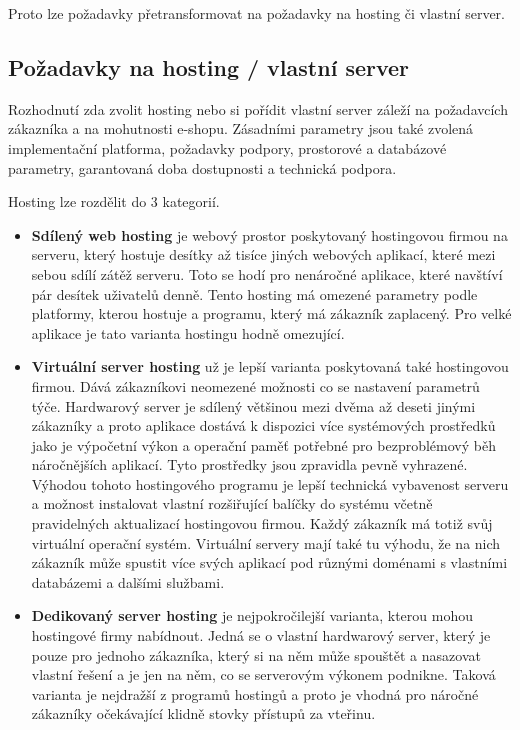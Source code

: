 \documentclass[11pt,twoside,a4paper]{book}
\begin{document}
Proto lze požadavky přetransformovat na požadavky na hosting či vlastní server.

\subsection{Požadavky na hosting / vlastní server}
Rozhodnutí zda zvolit hosting nebo si pořídit vlastní server záleží na požadavcích zákazníka a na mohutnosti e-shopu. Zásadními parametry jsou také zvolená implementační platforma, požadavky podpory, prostorové a databázové parametry, garantovaná doba dostupnosti a technická podpora.

Hosting lze rozdělit do 3 kategorií.

\begin{itemize}
\item \textbf{Sdílený web hosting} je webový prostor poskytovaný hostingovou firmou na serveru, který hostuje desítky až tisíce jiných webových aplikací, které mezi sebou sdílí zátěž serveru. Toto se hodí pro nenáročné aplikace, které navštíví pár desítek uživatelů denně. Tento hosting má omezené parametry podle platformy, kterou hostuje a programu, který má zákazník zaplacený. Pro velké aplikace je tato varianta hostingu hodně omezující.

\item \textbf{Virtuální server hosting} už je lepší varianta poskytovaná také hostingovou firmou. Dává zákazníkovi neomezené možnosti co se nastavení parametrů týče. Hardwarový server je sdílený většinou mezi dvěma až deseti jinými zákazníky a proto aplikace dostává k dispozici více systémových prostředků jako je výpočetní výkon a operační paměť potřebné pro bezproblémový běh náročnějších aplikací. Tyto prostředky jsou zpravidla pevně vyhrazené. Výhodou tohoto hostingového programu je lepší technická vybavenost serveru a možnost instalovat vlastní rozšiřující balíčky do systému včetně pravidelných aktualizací hostingovou firmou. Každý zákazník má totiž svůj virtuální operační systém. Virtuální servery mají také tu výhodu, že na nich zákazník může spustit více svých aplikací pod různými doménami s vlastními databázemi a dalšími službami.

\item \textbf{Dedikovaný server hosting}  je nejpokročilejší varianta, kterou mohou hostingové firmy nabídnout. Jedná se o vlastní hardwarový server, který je pouze pro jednoho zákazníka, který si na něm může spouštět a nasazovat vlastní řešení a je jen na něm, co se serverovým výkonem podnikne. Taková varianta je nejdražší z programů hostingů a proto je vhodná pro náročné zákazníky očekávající klidně stovky přístupů za vteřinu. 

\end{itemize}
\end{document}
